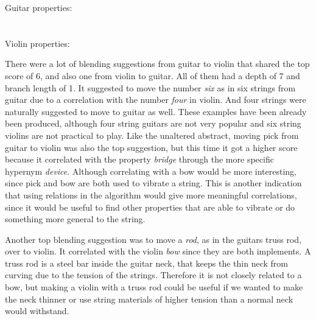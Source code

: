Guitar properties:\\
\noindent{}	
\\\\Violin properties:\\
\noindent{}
		

There were a lot of blending suggestions from guitar to violin that shared the top score of 6, and also one from violin to guitar. All of them had a depth of 7 and branch length of 1. It suggested to move the number \emph{six} as in six strings from guitar due to a correlation with the number \emph{four} in violin. And four strings were naturally suggested to move to guitar as well. These examples have been already been produced, although four string guitars are not very popular and six string violins are not practical to play. Like the unaltered abstract, moving pick from guitar to violin was also the top suggestion, but this time it got a higher score because it correlated with the property \emph{bridge} through the more specific hypernym \emph{device}. Although correlating with a bow would be more interesting, since pick and bow are both used to vibrate a string. This is another indication that using relations in the algorithm would give more meaningful correlations, since it would be useful to find other properties that are able to vibrate or do something more general to the string.

Another top blending suggestion was to move a \emph{rod}, as in the guitars truss rod, over to violin. It correlated with the violin \emph{bow} since they are both implements. A truss rod is a steel bar inside the guitar neck, that keeps the thin neck from curving due to the tension of the strings. Therefore it is not closely related to a bow, but making a violin with a truss rod could be useful if we wanted to make the neck thinner or use string materials of higher tension than a normal neck would withstand. %

